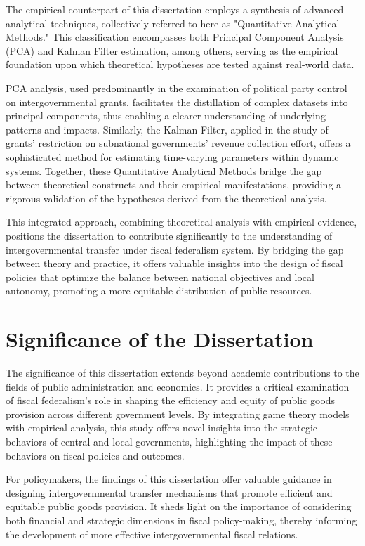 The empirical counterpart of this dissertation employs a synthesis of advanced analytical techniques, collectively referred to here as "Quantitative Analytical Methods." This classification encompasses both Principal Component Analysis (PCA) and Kalman Filter estimation, among others, serving as the empirical foundation upon which theoretical hypotheses are tested against real-world data.

PCA analysis, used predominantly in the examination of political party control on intergovernmental grants, facilitates the distillation of complex datasets into principal components, thus enabling a clearer understanding of underlying patterns and impacts. Similarly, the Kalman Filter, applied in the study of grants' restriction on subnational governments' revenue collection effort, offers a sophisticated method for estimating time-varying parameters within dynamic systems. Together, these Quantitative Analytical Methods bridge the gap between theoretical constructs and their empirical manifestations, providing a rigorous validation of the hypotheses derived from the theoretical analysis.

This integrated approach, combining theoretical analysis with empirical evidence, positions the dissertation to contribute significantly to the understanding of intergovernmental transfer under fiscal federalism system. By bridging the gap between theory and practice, it offers valuable insights into the design of fiscal policies that optimize the balance between national objectives and local autonomy, promoting a more equitable distribution of public resources.

\section{Significance of the Dissertation}

The significance of this dissertation extends beyond academic contributions to the fields of public administration and economics. It provides a critical examination of fiscal federalism's role in shaping the efficiency and equity of public goods provision across different government levels. By integrating game theory models with empirical analysis, this study offers novel insights into the strategic behaviors of central and local governments, highlighting the impact of these behaviors on fiscal policies and outcomes.

For policymakers, the findings of this dissertation offer valuable guidance in designing intergovernmental transfer mechanisms that promote efficient and equitable public goods provision. It sheds light on the importance of considering both financial and strategic dimensions in fiscal policy-making, thereby informing the development of more effective intergovernmental fiscal relations.

